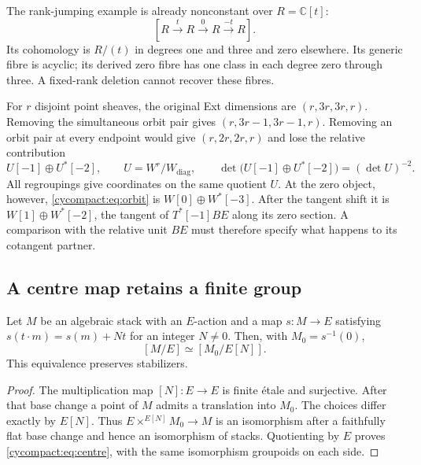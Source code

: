The rank-jumping example is already nonconstant over
$R=\mathbb C[t]$:
\begin{equation}\label{cycompact:eq:orbit-jump}
 [R\xrightarrow{t}R\xrightarrow{0}R\xrightarrow{-t}R].
\end{equation}
Its cohomology is $R/(t)$ in degrees one and three and zero
elsewhere. Its generic fibre is acyclic; its derived zero fibre
has one class in each degree zero through three. A fixed-rank
deletion cannot recover these fibres.

For $r$ disjoint point sheaves, the original Ext dimensions are
$(r,3r,3r,r)$. Removing the simultaneous orbit pair gives
$(r,3r-1,3r-1,r)$. Removing an orbit pair at every endpoint
would give $(r,2r,2r,r)$ and lose the relative contribution
\begin{equation}\label{cycompact:eq:orbit-excess}
 U[-1]\oplus U^*[-2],\qquad
 U=W^r/W_{\mathrm{diag}},\qquad
 \det\bigl(U[-1]\oplus U^*[-2]\bigr)=(\det U)^{-2}.
\end{equation}
All regroupings give coordinates on the same quotient $U$.
At the zero object, however, \eqref{cycompact:eq:orbit} is
$W[0]\oplus W^*[-3]$. After the tangent shift it is
$W[1]\oplus W^*[-2]$, the tangent of $T^*[-1]BE$ along its
zero section. A comparison with the relative unit $BE$ must
therefore specify what happens to its cotangent partner.

\subsection{A centre map retains a finite group}

\begin{proposition}\label{cycompact:prop:centre}
Let $M$ be an algebraic stack with an $E$-action and a map
$s:M\to E$ satisfying
$s(t\cdot m)=s(m)+Nt$ for an integer $N\ne0$.
Then, with $M_0=s^{-1}(0)$,
\begin{equation}\label{cycompact:eq:centre}
 [M/E]\simeq[M_0/E[N]].
\end{equation}
This equivalence preserves stabilizers.
\end{proposition}

\begin{proof}
The multiplication map $[N]:E\to E$ is finite \'{e}tale and
surjective. After that base change a point of $M$ admits
a translation into $M_0$. The choices differ exactly by
$E[N]$. Thus $E\times^{E[N]}M_0\to M$ is an isomorphism
after a faithfully flat base change and hence an isomorphism
of stacks. Quotienting by $E$ proves \eqref{cycompact:eq:centre},
with the same isomorphism groupoids on each side.
\end{proof}

